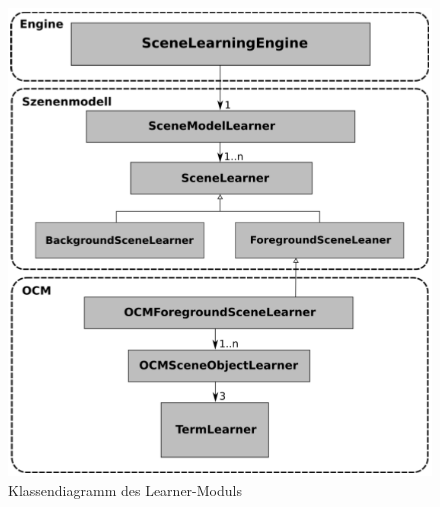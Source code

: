 \begin{deprecated}
\cite{gehrung14}
\end{deprecated}
\begin{figure}
	\centering
	\includegraphics[width=15cm]{bilder/LearnerClass.pdf}
	\caption{Klassendiagramm des Learner-Moduls}
	\label{img:learnerclass}
\end{figure}
